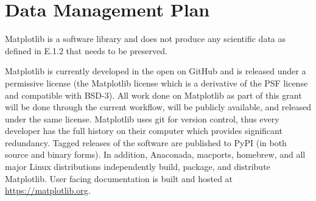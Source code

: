 \documentclass[12pt]{article}
\numberwithin{page}{section}
\begin{document}
\def\sovast{\ref@jnl{Soviet~Ast.}}      %
\def\ssr{\ref@jnl{Space~Sci.~Rev.}}     %
\def\zap{\ref@jnl{ZAp}}                 %
\def\nat{\ref@jnl{Nature}}              %
\def\iaucirc{\ref@jnl{IAU~Circ.}}       %
\def\aplett{\ref@jnl{Astrophys.~Lett.}} %
\def\apspr{\ref@jnl{Astrophys.~Space~Phys.~Res.}}
\def\bain{\ref@jnl{Bull.~Astron.~Inst.~Netherlands}}
\def\fcp{\ref@jnl{Fund.~Cosmic~Phys.}}  %
\def\gca{\ref@jnl{Geochim.~Cosmochim.~Acta}}   %
\def\grl{\ref@jnl{Geophys.~Res.~Lett.}} %
\def\jcp{\ref@jnl{J.~Chem.~Phys.}}      %
\def\jgr{\ref@jnl{J.~Geophys.~Res.}}    %
\def\jqsrt{\ref@jnl{J.~Quant.~Spec.~Radiat.~Transf.}}
\def\memsai{\ref@jnl{Mem.~Soc.~Astron.~Italiana}}
\def\nphysa{\ref@jnl{Nucl.~Phys.~A}}   %
\def\physrep{\ref@jnl{Phys.~Rep.}}   %
\def\physscr{\ref@jnl{Phys.~Scr}}   %
\def\planss{\ref@jnl{Planet.~Space~Sci.}}   %
\def\procspie{\ref@jnl{Proc.~SPIE}}   %

\let\astap=\aap
\let\apjlett=\apjl
\let\apjsupp=\apjs
\let\applopt=\ao
\setcounter{page}{1}


\newpage
\section{Data Management Plan}
\setcounter{page}{1}

Matplotlib is a software library and does not produce any scientific
data as defined in E.1.2 that needs to be preserved.

Matplotlib is currently developed in the open on GitHub and is
released under a permissive license (the Matplotlib license which is a
derivative of the PSF license and compatible with BSD-3).  All work
done on Matplotlib as part of this grant will be done through the
current workflow, will be publicly available, and released under the
same license.  Matplotlib uses git for version control, thus every
developer has the full history on their computer which provides
significant redundancy.  Tagged releases of the software are published
to PyPI (in both source and binary forms).  In addition, Anaconada,
macports, homebrew, and all major Linux distributions independently
build, package, and distribute Matplotlib.  User facing documentation is built
and hosted at \url{https://matplotlib.org}.
\end{document}
